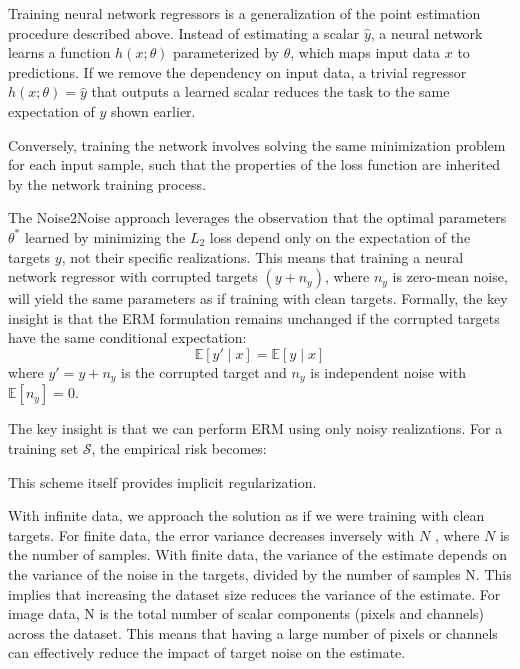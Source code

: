 Training neural network regressors is a generalization of the point estimation procedure described above. Instead of estimating a scalar $\hat{y}$, a neural network learns a function $h(x; \theta)$ parameterized by $\theta$, which maps input data $x$ to predictions. If we remove the dependency on input data, a trivial regressor $h(x; \theta) = \hat{y}$ that outputs a learned scalar reduces the task to the same expectation of $y$ shown earlier.

Conversely, training the network involves solving the same minimization problem for each input sample, such that the properties of the loss function are inherited by the network training process.

The Noise2Noise approach leverages the observation that the optimal parameters $\theta^*$ learned by minimizing the $L_2$ loss depend only on the expectation of the targets $y$, not their specific realizations. This means that training a neural network regressor with corrupted targets $(y + n_y)$, where $n_y$ is zero-mean noise, will yield the same parameters as if training with clean targets. Formally, the key insight is that the ERM formulation remains unchanged if the corrupted targets have the same conditional expectation:
\begin{equation}
    \mathbb{E}[y{\prime} \mid x] = \mathbb{E}[y \mid x]
\end{equation}
where $y{\prime} = y + n_y$ is the corrupted target and $n_y$ is independent noise with $\mathbb{E}[n_y] = 0$.

The key insight is that we can perform \gls{ERM} using only noisy realizations. For a training set $\mathcal{S}$, the empirical risk becomes:


This scheme itself provides implicit regularization.

With infinite data, we approach the solution as if we were training with clean targets. For finite data, the error variance decreases inversely with $N$ \cite[supplementary~material]{lehtinenNoise2NoiseLearningImage2018}, where $N$ is the number of samples. With finite data, the variance of the estimate depends on the variance of the noise in the targets, divided by the number of samples N. This implies that increasing the dataset size reduces the variance of the estimate. For image data, N is the total number of scalar components (pixels and channels) across the dataset. This means that having a large number of pixels or channels can effectively reduce the impact of target noise on the estimate.

